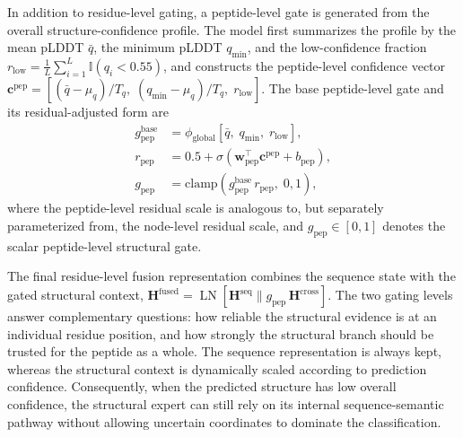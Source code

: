 \documentclass[12pt]{article}
\begin{document}
In addition to residue-level gating, a peptide-level gate is generated from
the overall structure-confidence profile. The model first summarizes the
profile by the mean pLDDT $\bar{q}$, the minimum pLDDT $q_{\min}$, and the
low-confidence fraction
$r_{\mathrm{low}} = \frac{1}{L}\sum_{i=1}^{L}\mathbb{I}(q_i < 0.55)$, and
constructs the peptide-level confidence vector
$\mathbf c^{\mathrm{pep}} = \left[(\bar{q} - \mu_q)/T_q,\;
(q_{\min} - \mu_q)/T_q,\; r_{\mathrm{low}}\right]$. The base peptide-level
gate and its residual-adjusted form are
\begin{equation}
    \begin{aligned}
        g_{\mathrm{pep}}^{\mathrm{base}} &= \phi_{\mathrm{global}}\left[\bar{q},\; q_{\min},\; r_{\mathrm{low}}\right],\\
        r_{\mathrm{pep}} &= 0.5 + \sigma\left(\mathbf w_{\mathrm{pep}}^{\top} \mathbf c^{\mathrm{pep}} + b_{\mathrm{pep}}\right),\\
        g_{\mathrm{pep}} &= \mathrm{clamp}\left(g_{\mathrm{pep}}^{\mathrm{base}}\, r_{\mathrm{pep}},\; 0, 1\right),
    \end{aligned}
    \label{eq:peptide_gate}
\end{equation}
where the peptide-level residual scale is analogous to, but separately
parameterized from, the node-level residual scale, and $g_{\mathrm{pep}} \in
[0,1]$ denotes the scalar peptide-level structural gate.

The final residue-level fusion representation combines the sequence state
with the gated structural context,
$\mathbf H^{\mathrm{fused}} = \operatorname{LN}\left[\mathbf H^{\mathrm{seq}}
\parallel g_{\mathrm{pep}}\, \mathbf H^{\mathrm{cross}}\right]$.
The two gating levels answer complementary questions: how reliable the
structural evidence is at an individual residue position, and how strongly the
structural branch should be trusted for the peptide as a whole. The sequence
representation is always kept, whereas the structural context is
dynamically scaled according to prediction confidence. Consequently, when the
predicted structure has low overall confidence, the structural expert can
still rely on its internal sequence-semantic pathway without allowing
uncertain coordinates to dominate the classification.
\end{document}
